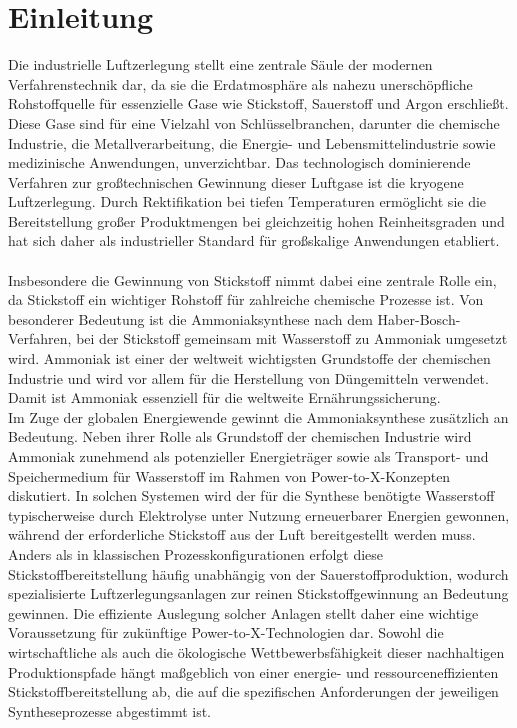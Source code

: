 \chapter{Einleitung}
\label{ch:einleitung}

Die industrielle Luftzerlegung stellt eine zentrale Säule der modernen Verfahrenstechnik dar, da sie die Erdatmosphäre als nahezu unerschöpfliche Rohstoffquelle für essenzielle Gase wie Stickstoff, Sauerstoff und Argon erschließt. Diese Gase sind für eine Vielzahl von Schlüsselbranchen, darunter die chemische Industrie, die Metallverarbeitung, die Energie- und Lebensmittelindustrie sowie medizinische Anwendungen, unverzichtbar. Das technologisch dominierende Verfahren zur großtechnischen Gewinnung dieser Luftgase ist die kryogene Luftzerlegung. Durch Rektifikation bei tiefen Temperaturen ermöglicht sie die Bereitstellung großer Produktmengen bei gleichzeitig hohen Reinheitsgraden und hat sich daher als industrieller Standard für großskalige Anwendungen etabliert.\\
\\
Insbesondere die Gewinnung von Stickstoff nimmt dabei eine zentrale Rolle ein, da Stickstoff ein wichtiger Rohstoff für zahlreiche chemische Prozesse ist. Von besonderer Bedeutung ist die Ammoniaksynthese nach dem Haber-Bosch-Verfahren, bei der Stickstoff gemeinsam mit Wasserstoff zu Ammoniak umgesetzt wird. Ammoniak ist einer der weltweit wichtigsten Grundstoffe der chemischen Industrie und wird vor allem für die Herstellung von Düngemitteln verwendet. Damit ist Ammoniak essenziell für die weltweite Ernährungssicherung.\\
Im Zuge der globalen Energiewende gewinnt die Ammoniaksynthese zusätzlich an Bedeutung. Neben ihrer Rolle als Grundstoff der chemischen Industrie wird Ammoniak zunehmend als potenzieller Energieträger sowie als Transport- und Speichermedium für Wasserstoff im Rahmen von Power-to-X-Konzepten diskutiert. In solchen Systemen wird der für die Synthese benötigte Wasserstoff typischerweise durch Elektrolyse unter Nutzung erneuerbarer Energien gewonnen, während der erforderliche Stickstoff aus der Luft bereitgestellt werden muss. Anders als in klassischen Prozesskonfigurationen erfolgt diese Stickstoffbereitstellung häufig unabhängig von der Sauerstoffproduktion, wodurch spezialisierte Luftzerlegungsanlagen zur reinen Stickstoffgewinnung an Bedeutung gewinnen. Die effiziente Auslegung solcher Anlagen stellt daher eine wichtige Voraussetzung für zukünftige Power-to-X-Technologien dar. Sowohl die wirtschaftliche als auch die ökologische Wettbewerbsfähigkeit dieser nachhaltigen Produktionspfade hängt maßgeblich von einer energie- und ressourceneffizienten Stickstoffbereitstellung ab, die auf die spezifischen Anforderungen der jeweiligen Syntheseprozesse abgestimmt ist.\\
